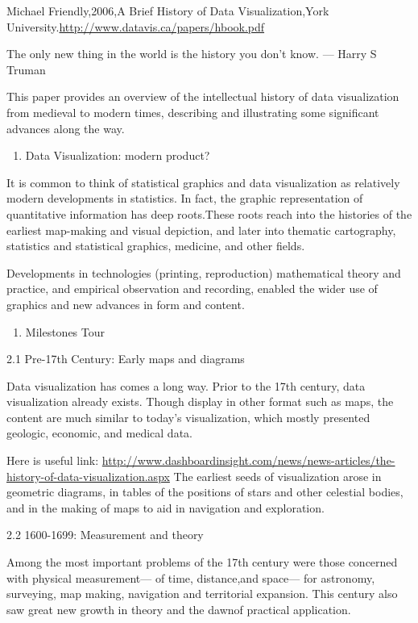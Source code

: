 \documentclass[]{book}
\providecommand{\tightlist}{%
  \setlength{\itemsep}{0pt}\setlength{\parskip}{0pt}}
\theoremstyle{definition}
\theoremstyle{definition}
\theoremstyle{definition}
\theoremstyle{remark}
\begin{document}
Michael Friendly,2006,A Brief History of Data Visualization,York
University.\url{http://www.datavis.ca/papers/hbook.pdf}

The only new thing in the world is the history you don't know. --- Harry
S Truman

This paper provides an overview of the intellectual history of data
visualization from medieval to modern times, describing and illustrating
some significant advances along the way.

\begin{enumerate}
\def\labelenumi{\arabic{enumi}.}
\tightlist
\item
  Data Visualization: modern product?
\end{enumerate}

It is common to think of statistical graphics and data visualization as
relatively modern developments in statistics. In fact, the graphic
representation of quantitative information has deep roots.These roots
reach into the histories of the earliest map-making and visual
depiction, and later into thematic cartography, statistics and
statistical graphics, medicine, and other fields.

Developments in technologies (printing, reproduction) mathematical
theory and practice, and empirical observation and recording, enabled
the wider use of graphics and new advances in form and content.

\begin{enumerate}
\def\labelenumi{\arabic{enumi}.}
\setcounter{enumi}{1}
\tightlist
\item
  Milestones Tour
\end{enumerate}

2.1 Pre-17th Century: Early maps and diagrams

Data visualization has comes a long way. Prior to the 17th century, data
visualization already exists. Though display in other format such as
maps, the content are much similar to today's visualization, which
mostly presented geologic, economic, and medical data.

Here is useful link:
\url{http://www.dashboardinsight.com/news/news-articles/the-history-of-data-visualization.aspx}
The earliest seeds of visualization arose in geometric diagrams, in
tables of the positions of stars and other celestial bodies, and in the
making of maps to aid in navigation and exploration.

2.2 1600-1699: Measurement and theory

Among the most important problems of the 17th century were those
concerned with physical measurement--- of time, distance,and space---
for astronomy, surveying, map making, navigation and territorial
expansion. This century also saw great new growth in theory and the
dawnof practical application.
\end{document}
